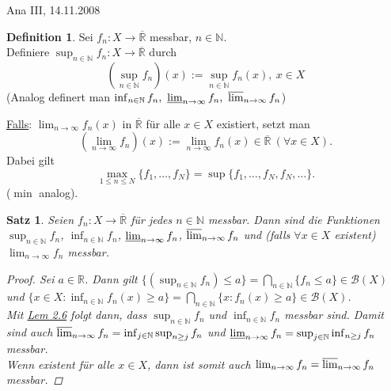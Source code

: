 \documentclass[a4paper]{report}
\newcommand{\R}{\mathbb{R}}
\newcommand{\Rq}{\overline{\R}}
\newcommand{\N}{\mathbb{N}}
\newcommand{\Borel}{\mathcal{B}}
\newcommand{\toInf}{\rightarrow \infty}
\newcommand{\limToInf}[1]{\lim_{#1 \toInf}}
\newcommand{\jlabel}[1]{\label{j_#1}}
\newcommand{\jhyperref}[2]{\hyperref[j_#1]{#2}}
\newcommand{\jlink}[1]{\jhyperref{#1}{#1}}
\newcommand{\jabb}[3]{ #1: #2 \rightarrow #3 }
\newcommand{\jspacesmall}{\vspace{4pt}}
\newcommand{\jdate}[1]{\jspacesmall\begin{center}\jlabel{#1}\tiny{Ana III, #1}\end{center}}
\theoremstyle{plain}
\newtheorem{satz}[thm]{Satz}
\theoremstyle{definition}
\newtheorem*{defn*}{Definition}
\begin{document}
{{{\jdate{14.11.2008}

\begin{defn*}
    Sei $\jabb{f_n}{X}{\Rq}$ messbar, $n\in\N$.\\
    Definiere $\jabb{\sup_{n\in\N} f_n}{X}{\Rq}$ durch 
    \begin{displaymath}
            \left( \sup_{n\in\N} f_n \right)(x) := \sup_{n\in\N} f_n(x), \ x\in X
    \end{displaymath}
    (Analog definert man $\inf_{n\in\N} f_n, \ \varliminf_{n\rightarrow \infty} f_n, \ \varlimsup_{n\rightarrow \infty} f_n$)
    
    \vspace{12pt}
    
    \uline{Falls}: $\limToInf{n} f_n(x)$ in $\Rq$ für alle $x\in X$ existiert, setzt man
    \begin{displaymath}
        \left (\limToInf{n} f_n \right)(x) := \limToInf{n} f_n(x) \in \Rq \ (\forall x\in X).
    \end{displaymath}
    Dabei gilt
    \begin{displaymath}
        \max_{1\le n\le N}\{f_1,\dots,f_N\} = \sup\{f_1,\dots,f_N, f_N,\dots\}.
    \end{displaymath}
    ($\min$ analog).
\end{defn*}


\begin{satz}
\jlabel{Satz 2.7}
    Seien $\jabb{f_n}{X}{\Rq}$ für jedes $n\in\N$ messbar. Dann sind die Funktionen $\sup_{n\in\N}f_n$, $\inf_{n\in\N} f_n$, $\varliminf_{n\rightarrow \infty} f_n$, $\varlimsup_{n\rightarrow \infty} f_n$ und (falls $\forall x \in X$ existent) $\limToInf{n} f_n$ messbar.
    \begin{proof}
        Sei $a\in \R$. Dann gilt $\{(\sup_{n\in\N} f_n) \le a\} = \bigcap_{n\in\N} \{f_n \le a\} \in \Borel(X)$ und $\{x\in X : \inf_{n\in \N} f_n(x) \ge a\} = \bigcap_{n\in\N} \{x: f_n(x) \ge a\} \in \Borel(X)$.\\
        Mit \jlink{Lem 2.6} folgt dann, dass $\sup_{n\in\N} f_n$ und $\inf_{n\in\N} f_n$ messbar sind. Damit sind auch $\varlimsup_{n\rightarrow \infty} f_n = \inf_{j\in \N} \sup_{n\ge j} f_n$ und $\varliminf_{n\rightarrow \infty} f_n = \sup_{j\in\N}\inf_{n\ge j} f_n$ messbar.\\
        Wenn existent für alle $x\in X$, dann ist somit auch $\limToInf{n} f_n = \varlimsup_{n\rightarrow \infty} f_n$ messbar.
    \end{proof}
\end{satz}

}}}
\end{document}
